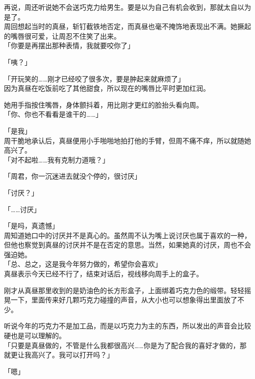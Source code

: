 再说，周还听说她不会送巧克力给男生。要是以为自己有机会收到，那就太自以为是了。\\

周回想起当时的真昼，斩钉截铁地否定，而真昼也毫不掩饰地表现出不满。她撅起的嘴唇很可爱，让周忍不住笑了出来。\\

「你要是再摆出那种表情，我就要咬你了」

「咦？」

「开玩笑的……刚才已经咬了很多次，要是肿起来就麻烦了」\\

因为真昼在吃饭前吃了其他甜食，所以现在的嘴唇比平时更加红润。

她用手指按住嘴唇，身体颤抖着，用比刚才更红的脸抬头看向周。\\

「你、你也不看看是谁干的……」

「是我」\\

周干脆地承认后，真昼便用小手啪啪地拍打他的手臂，但周不痛不痒，所以就随她高兴了。\\

「对不起啦……我有克制力道哦？」

「周君，你一沉迷进去就没个停的，很讨厌」

「讨厌？」

「……讨厌」

「是吗，真遗憾」\\

周知道她口中的讨厌并不是真心的。虽然周不认为嘴上说讨厌也属于喜欢的一种，但他也察觉到真昼的讨厌并不是在否定的意思。当然，如果她真的讨厌，周也不会强迫她。\\

「总、总之，这是我今年努力做的，希望你会喜欢」\\

真昼表示今天已经不行了，结束对话后，视线移向周手上的盒子。

刚才从真昼那里收到的是奶油色的长方形盒子，上面绑着巧克力色的缎带。轻轻摇晃一下，里面传来好几颗巧克力碰撞的声音，从大小也可以想象得出里面放了不少。

听说今年的巧克力不是加工品，而是以巧克力为主的东西，所以发出的声音会比较硬也是可以理解的。\\

「只要是真昼做的，不管是什么我都很高兴……你是为了配合我的喜好才做的，那就更让我高兴了。我可以打开吗？」

「嗯」\\

